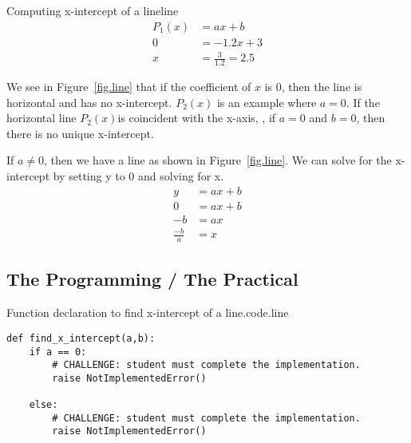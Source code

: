 \begin{example}{Computing x-intercept of a line}{line}
  \begin{align*}
  P_1(x) &= a x + b \\
  0  &= -1.2 x + 3\\
  x &= \frac{3}{1.2} = 2.5
  \end{align*}
\end{example}

We see in Figure~\ref{fig.line} that if the coefficient of $x$ is 0, then the
line is horizontal and has no x-intercept. $P_2(x)$ is an example where $a=0$.
If the horizontal line $P_2(x)$is coincident
with the x-axis, \ie, if $a=0$ and $b=0$, then there is no unique x-intercept.





If $a\neq 0$,  then we have a line as shown in Figure~\ref{fig.line}.  We can
solve for the x-intercept by setting y to 0 and solving for x.
\begin{align*}
  y &= a x + b\\
  0 &= a x + b\\
  -b &= a x\\
  \frac{-b}{a} &= x
\end{align*}



\subsection{The Programming / The Practical}


\begin{listing}{Function declaration to find x-intercept of a line.}{code.line}
\begin{minipage}[c]{0.95\textwidth}\begin{lstlisting}
def find_x_intercept(a,b):
    if a == 0:
        # CHALLENGE: student must complete the implementation.
        raise NotImplementedError()

    else:
        # CHALLENGE: student must complete the implementation.
        raise NotImplementedError()
\end{lstlisting}\end{minipage}\end{listing}


